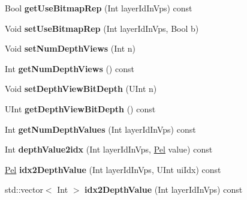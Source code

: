 \begin{DoxyCompactItemize}
\mbox{\label{class_t_com_d_l_t_a1c30dcee9cb3978f207238a6af5ee5da}} 
Bool {\bfseries get\+Use\+Bitmap\+Rep} (Int layer\+Id\+In\+Vps) const
\item 
\mbox{\label{class_t_com_d_l_t_aec47a59522baad954270e737ec517572}} 
Void {\bfseries set\+Use\+Bitmap\+Rep} (Int layer\+Id\+In\+Vps, Bool b)
\item 
\mbox{\label{class_t_com_d_l_t_af9a106e9285540fa627e0f98f602115f}} 
Void {\bfseries set\+Num\+Depth\+Views} (Int n)
\item 
\mbox{\label{class_t_com_d_l_t_ab5faa05446471878bc3e934ed9250959}} 
Int {\bfseries get\+Num\+Depth\+Views} () const
\item 
\mbox{\label{class_t_com_d_l_t_a54bc11ced54324bd2b1f654d55d36112}} 
Void {\bfseries set\+Depth\+View\+Bit\+Depth} (U\+Int n)
\item 
\mbox{\label{class_t_com_d_l_t_a11ca665b11681752ebd1f25315ddebb7}} 
U\+Int {\bfseries get\+Depth\+View\+Bit\+Depth} () const
\item 
\mbox{\label{class_t_com_d_l_t_a30e5851b2e1f24e03a88a0e4573a53bf}} 
Int {\bfseries get\+Num\+Depth\+Values} (Int layer\+Id\+In\+Vps) const
\item 
\mbox{\label{class_t_com_d_l_t_a1d3855150a6fcfbb6974c41131abdbe6}} 
Int {\bfseries depth\+Value2idx} (Int layer\+Id\+In\+Vps, \hyperlink{_type_def_8h_af92141699657699b4b547be0c8517541}{Pel} value) const
\item 
\mbox{\label{class_t_com_d_l_t_a077c3af72c155badd6fe64e85d89cc88}} 
\hyperlink{_type_def_8h_af92141699657699b4b547be0c8517541}{Pel} {\bfseries idx2\+Depth\+Value} (Int layer\+Id\+In\+Vps, U\+Int ui\+Idx) const
\item 
\mbox{\label{class_t_com_d_l_t_a38c6401be04c9c287662b8be418b8f26}} 
std\+::vector$<$ Int $>$ {\bfseries idx2\+Depth\+Value} (Int layer\+Id\+In\+Vps) const
\end{DoxyCompactItemize}
